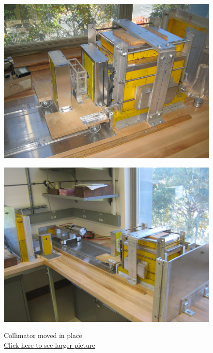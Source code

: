 \documentclass{../lab}
\begin{document}
\begin{figure}[H]
\captionsetup{justification=centering}
  \href{http://experimentationlab.berkeley.edu/sites/default/files/images/GMA_Layout_3538-Lg.jpg}{\includegraphics[width=\linewidth,keepaspectratio]{images/GMA_Layout_3538-Lg.jpg}}
  \caption{Collimator moved in place \\ \href{http://experimentationlab.berkeley.edu/sites/default/files/images/GMA_Layout_3538-Lg.jpg}{Click here to see larger picture}}
  \label{fig:CollimatorMovedIn}
\endminipage\hfill
{}
  \href{http://experimentationlab.berkeley.edu/sites/default/files/images/GMA_PMT_3519-Lg.jpg}{\includegraphics[width=\linewidth,keepaspectratio]{images/GMA_PMT_3519-Lg.jpg}}

\end{figure}
\end{document}
